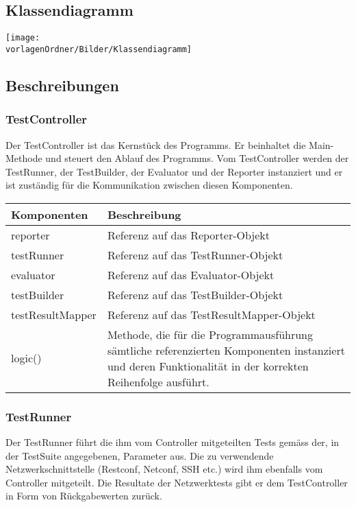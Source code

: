 \documentclass[
	ngerman,
	toc=listof, %
	toc=bibliography, %
	footnotes=multiple, %
	parskip=half, %
	numbers=noendperiod %
]{scrartcl}
\newcommand{\vorlagenOrdner}{../../99_Vorlagen} %
\begin{document}
\begin{landscape}
	\section{Klassendiagramm}
	\texttt{[image: \\vorlagenOrdner/Bilder/Klassendiagramm]}
	\newpage	
\end{landscape}


	\subsection{Beschreibungen}

	\subsubsection{TestController}
	Der TestController ist das Kernstück des Programms. 
	Er beinhaltet die Main-Methode und steuert den Ablauf des Programms. 
	Vom TestController werden der TestRunner, der TestBuilder, der Evaluator und der Reporter instanziert und er ist zuständig für die Kommunikation zwischen diesen Komponenten.
	
	\begin{tabularx}{\textwidth}{lX}
		\toprule
			Komponenten & Beschreibung \\
		\midrule
			reporter & Referenz auf das Reporter-Objekt \\
			testRunner & Referenz auf das TestRunner-Objekt \\
			evaluator & Referenz auf das Evaluator-Objekt \\
			testBuilder & Referenz auf das TestBuilder-Objekt \\
			testResultMapper & Referenz auf das TestResultMapper-Objekt \\
		\midrule
			logic() & Methode, die für die Programmausführung sämtliche referenzierten Komponenten instanziert und deren Funktionalität in der korrekten Reihenfolge ausführt.\\
		\bottomrule
	\end{tabularx}

	\subsubsection{TestRunner}
	Der TestRunner führt die ihm vom Controller mitgeteilten Tests gemäss der, in der TestSuite angegebenen, Parameter aus. 
	Die zu verwendende Netzwerkschnittstelle (Restconf, Netconf, SSH etc.) wird ihm ebenfalls vom Controller mitgeteilt.
	Die Resultate der Netzwerktests gibt er dem TestController in Form von Rückgabewerten zurück.
\end{document}
